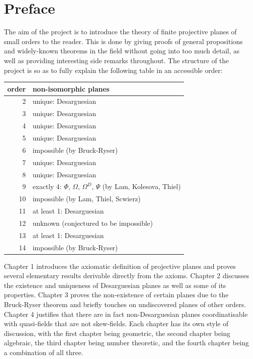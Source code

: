 \documentclass{report}
\theoremstyle{definition}\newtheorem*{definition}{Definition}
\theoremstyle{definition}\newtheorem*{example}{Example}
\theoremstyle{remark}\newtheorem*{remark}{Remark}
\begin{document}
\tableofcontents

\pagebreak

\chapter*{Preface}


The aim of the project is to introduce the theory of finite projective planes of small orders to the reader. This is done by giving proofs of general propositions and widely-known theorems in the field without going into too much detail, as well as providing interesting side remarks throughout. The structure of the project is so as to fully explain the following table in an accessible order:

\begin{center}
\begin{tabular}{|r|l|}
\hline
order & non-isomorphic planes \\
\hline
2 & unique: Desarguesian \\
3 & unique: Desarguesian \\
4 & unique: Desarguesian \\
5 & unique: Desarguesian \\
6 & impossible (by Bruck-Ryser) \\
7 & unique: Desarguesian \\
8 & unique: Desarguesian \\
9 & exactly 4: $ \Phi $, $ \Omega $, $ \Omega^D $, $ \Psi $ (by Lam, Kolesova, Thiel) \\
10 & impossible (by Lam, Thiel, Scwierz) \\
11 & at least 1: Desarguesian \\
12 & unknown (conjectured to be impossible) \\
13 & at least 1: Desarguesian \\
14 & impossible (by Bruck-Ryser) \\
\hline
\end{tabular}
\end{center}

Chapter 1 introduces the axiomatic definition of projective planes and proves several elementary results derivable directly from the axioms. Chapter 2 discusses the existence and uniqueness of Desarguesian planes as well as some of its properties. Chapter 3 proves the non-existence of certain planes due to the Bruck-Ryser theorem and briefly touches on undiscovered planes of other orders. Chapter 4 justifies that there are in fact non-Desarguesian planes coordinatisable with quasi-fields that are not skew-fields. Each chapter has its own style of discussion, with the first chapter being geometric, the second chapter being algebraic, the third chapter being number theoretic, and the fourth chapter being a combination of all three.
\end{document}
